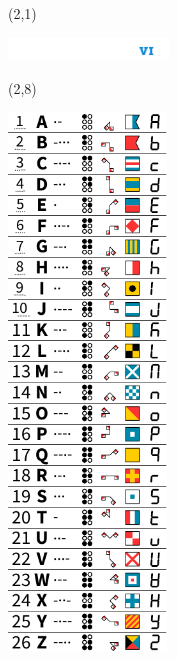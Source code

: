 \documentclass{extarticle}
\begin{document}
\pagecolor{black}
\pagestyle{empty}


\begin{textblock}{42}(2,1)
\vfill
{\centerline{\includegraphics[height=6mm]{tools/images/logo-navic-6.pdf}}} 
\vfill
\end{textblock}

\begin{textblock}{42}(2,8)
\vfill
{\centerline{\includegraphics[width=42mm]{tools/main.pdf}}} 
\vfill
\end{textblock}
\end{document}

